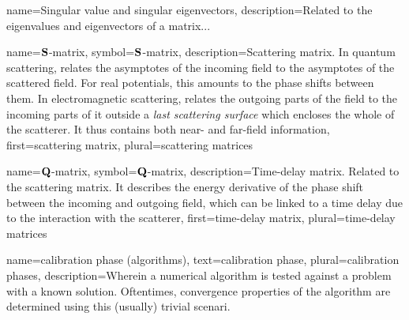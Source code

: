 
%
{%
  name={Singular value and singular eigenvectors},
  description={Related to the eigenvalues and eigenvectors of a matrix...}
}

%
{%
  name={$\mathbf{S}$-matrix},
  symbol={$\mathbf{S}$-matrix},
  description={Scattering matrix. In quantum scattering, relates the asymptotes of the
  				incoming field to the asymptotes of the scattered field. For real potentials,
  				this amounts to the phase shifts between them. In electromagnetic scattering,
  				relates the outgoing parts of the field to the incoming parts of it outside 
  				a \textit{last scattering surface} which encloses the whole of the scatterer.
  				It thus contains both near- and far-field information},
  first={scattering matrix},
  plural={scattering matrices}
}

%
{%
  name={$\mathbf{Q}$-matrix},
  symbol={$\mathbf{Q}$-matrix},
  description={Time-delay matrix. Related to the scattering matrix. 
  				It describes the energy derivative of the phase
  				shift between the incoming and outgoing field, which
  				can be linked to a time delay due to the interaction
  				with the scatterer},
  first={time-delay matrix},
  plural={time-delay matrices}
}

%
{%
  name={calibration phase (algorithms)},
  text={calibration phase},
  plural={calibration phases},
  description={Wherein a numerical algorithm is tested against a problem with a%
		known solution. Oftentimes, convergence properties of the algorithm
		are determined using this (usually) trivial scenari.}
}

